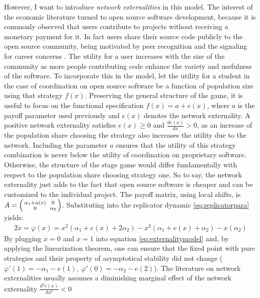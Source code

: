 However, I want to introduce \textit{network externalities} in this model. 
The interest of the economic literature turned to open source software 
development, because it is commonly observed that users contribute to 
projects without receiving a monetary payment for it.
In fact users share their source code publicly to the open source community,
being motivated by peer recognition and the signaling for career concerns
\parencite[21]{lerner_simple_2002}.
The utility for a user increases with the size of the community as 
more people contributing code enhance the variety and usefulness of the 
software. 
To incorporate this in the model, let the utility for a student 
in the case of coordination on open source software be a function of 
population size using that strategy $f(x)$. 
Preserving the general structure of the
game, it is useful to focus on the functional specification 
$f(x) = a + e(x)$, where $a$ is the payoff parameter used 
previously and $e(x)$ denotes the network externality. 
A positive network externality satisfies $e(x)\geq 0$ and 
$\frac{de(x)}{dx}>0$, 
as an increase of the population share choosing the strategy
also increases the utility due to the network. 
Including the parameter $a$ ensures that the utility of this 
strategy combination is never below the utility of coordination on 
proprietary software. Otherwise, the structure of the stage game would 
differ fundamentally with respect to the population share choosing strategy 
one. So to say, the network externality just adds to the fact that open 
source software is cheaper and can be customized to the individual project.
The payoff matrix, using local shifts, is 
$A=\begin{psmallmatrix}\alpha_1+u(x) && 0 \\ 0&& \alpha_2\end{psmallmatrix}$. 
Substituting into the replicator dynamic  \ref{eq:replicatorpara} yields:
\begin{alignat}{2}
        \dot{x} = \varphi(x) = x^2(\alpha_1+e(x) +2\alpha_2 ) 
        - x^3(\alpha_1+e(x)+\alpha_2) - x(\alpha_2)
        \label{eq:externalitymodel}
\end{alignat}
By plugging $x=0$ and $x=1$ into equation \eqref{eq:externalitymodel} and, 
by applying the linearization theorem, one can ensure 
that the fixed point with pure strategies and their
property of asymptotical stability did not change
($\varphi'(1) = -\alpha_1 -e(1),\ \varphi'(0) = -\alpha_2 -e(2)$).
The literature on network externalities usually assumes a diminishing
marginal effect of the network externality $\frac{d^2e(x)}{dx^2} <0$ 
